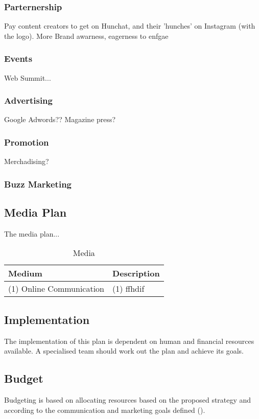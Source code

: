 \documentclass[12pt]{article}
\begin{document}
	\subsubsection{Parternership}
	Pay content creators to get on Hunchat, and their 'hunches' on Instagram (with the logo). More Brand awarness, eagerness to enfgae
	\subsubsection{Events}
	Web Summit...
	\subsubsection{Advertising}
	Google Adwords?? Magazine press?
	\subsubsection{Promotion}
	Merchadising?
	\subsubsection{Buzz Marketing}
	
\subsection{Media Plan}
The media plan...
\begin{table}[htbp]
\small
\caption{Media}
\label{table:media}
\centering
\begin{tabular}{ @{}P{0.2\textwidth}P{0.7\textwidth}@{} }
Medium	&	Description	\\ \hline
 (1) Online Communication	&	(1) ffhdif \\
\end{tabular}
\end{table}


\subsection{Implementation}
The implementation of this plan is dependent on human and financial resources available. A specialised team should work out the plan and achieve its goals.

\subsection{Budget}

Budgeting is based on allocating resources based on the proposed strategy and according to the communication and marketing goals defined (\cite{clow}). 
\end{document}
